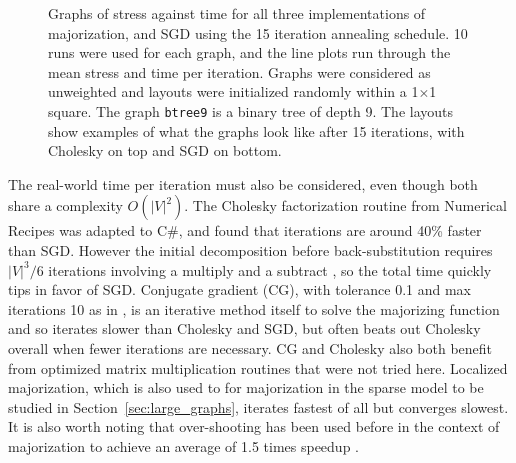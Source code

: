 \begin{figure}
  \centering
  \caption[Stress measured on a further selection of graphs]{Graphs of stress against time for all three implementations of majorization, and SGD using the 15 iteration annealing schedule. 10 runs were used for each graph, and the line plots run through the mean stress and time per iteration.
  Graphs were considered as unweighted
  and layouts were initialized randomly within a 1$\times$1 square.
  The graph \texttt{btree9} is a binary tree of depth 9. 
  The layouts show examples of what the graphs look like after 15 iterations, with Cholesky on top and SGD on bottom.
  }
  \label{fig:stress_plots_big}
\end{figure}

The real-world time per iteration must also be considered, even though both share a complexity $O(|V|^2)$. The Cholesky factorization routine from Numerical Recipes \cite{Press2007Cholesky} was adapted to C\#, and found that iterations are around 40\% faster than SGD. However the initial decomposition before back-substitution requires $|V|^3/6$ iterations involving a multiply and a subtract \cite{Press2007Cholesky}, so the total time quickly tips in favor of SGD.
Conjugate gradient (CG), with tolerance 0.1 and max iterations 10 as in \cite{Gansner2013}, is an iterative method itself to solve the majorizing function and so iterates slower than Cholesky and SGD, but often beats out Cholesky overall when fewer iterations are necessary.
CG and Cholesky also both benefit from optimized matrix multiplication routines \cite{Gansner2004} that were not tried here.
Localized majorization, which is also used to for majorization in the sparse model to be studied in Section~\ref{sec:large_graphs}, iterates fastest of all but converges slowest.
It is also worth noting that over-shooting has been used before in the context of majorization to achieve an average of 1.5 times speedup \cite{Wang2012}.

